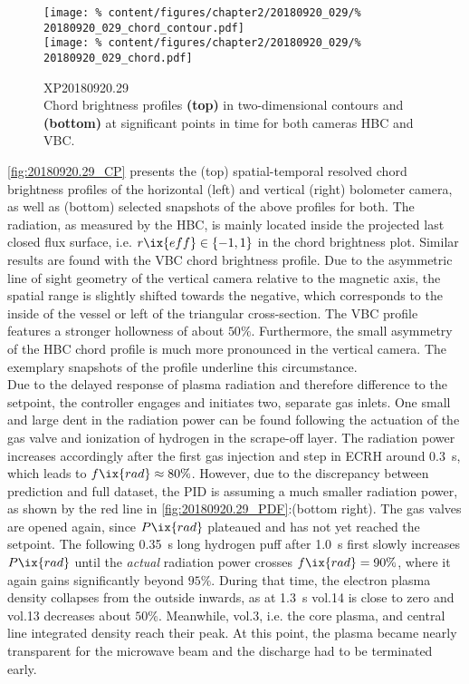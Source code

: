 %
            \begin{figure}[t]%
                \centering%
                \texttt{[image: \%
                    content/figures/chapter2/20180920\_029/\%
                    20180920\_029\_chord\_contour.pdf]}\\%
                \texttt{[image: \%
                    content/figures/chapter2/20180920\_029/\%
                    20180920\_029\_chord.pdf]}\\%
                \caption{%
                    XP20180920.29\\%
                    Chord brightness profiles \textbf{(top)} in two-dimensional contours and \textbf{(bottom)} at significant points in time for both cameras HBC and VBC.}\label{fig:20180920.29_CP}%
            \end{figure}%
%
            \autoref{fig:20180920.29_CP} presents the (top) spatial-temporal resolved chord brightness profiles of the horizontal (left) and vertical (right) bolometer camera, as well as (bottom) selected snapshots of the above profiles for both. The radiation, as measured by the HBC, is mainly located inside the projected last closed flux surface, i.e. $r\ix{eff}\in\left\{-1, 1\right\}$ in the chord brightness plot. Similar results are found with the VBC chord brightness profile. Due to the asymmetric line of sight geometry of the vertical camera relative to the magnetic axis, the spatial range is slightly shifted towards the negative, which corresponds to the inside of the vessel or left of the triangular cross-section. The VBC profile features a stronger hollowness of about $50\%$. Furthermore, the small asymmetry of the HBC chord profile is much more pronounced in the vertical camera. The exemplary snapshots of the profile underline this circumstance.\\%
            Due to the delayed response of plasma radiation and therefore difference to the setpoint, the controller engages and initiates two, separate gas inlets. One small and large dent in the radiation power can be found following the actuation of the gas valve and ionization of hydrogen in the scrape-off layer. The radiation power increases accordingly after the first gas injection and step in ECRH around \SI{0.3}{\second}, which leads to $f\ix{rad}\approx 80\%$. However, due to the discrepancy between prediction and full dataset, the PID is assuming a much smaller radiation power, as shown by the red line in \cref{fig:20180920.29_PDF}:(bottom right). The gas valves are opened again, since $P\ix{rad}$ plateaued and has not yet reached the setpoint. The following \SI{0.35}{\second} long hydrogen puff after \SI{1.0}{\second} first slowly increases $P\ix{rad}$ until the \textit{actual} radiation power crosses $f\ix{rad}=90\%$, where it again gains significantly beyond $95\%$. During that time, the electron plasma density collapses from the outside inwards, as at \SI{1.3}{\second} vol.14 is close to zero and vol.13 decreases about $50\%$. Meanwhile, vol.3, i.e. the core plasma, and central line integrated density reach their peak. At this point, the plasma became nearly transparent for the microwave beam and the discharge had to be terminated early.\\%
